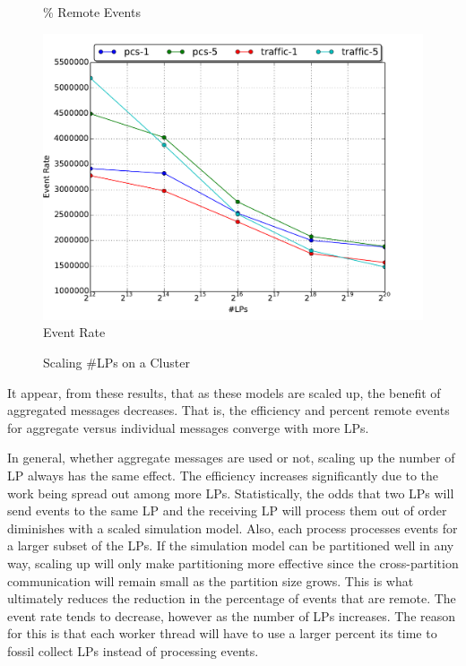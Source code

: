 \documentclass[11pt]{book}
\begin{document}
\begin{figure}
\begin{minipage}{.5\textwidth}
\begin{center}
      \% Remote Events \\
    \end{center}
  \end{minipage}
  \centering
  \begin{minipage}{.5\textwidth}
    \begin{center}
      \includegraphics[width=\textwidth,keepaspectratio,quiet]{figs/scale/scale_event_rate.pdf} \\
      Event Rate \\
    \end{center}
  \end{minipage}
  \caption{Scaling \#LPs on a Cluster}\label{scaling}
\end{figure}

It appear, from these results, that as these models are scaled up, the benefit of aggregated
messages decreases. That is, the efficiency and percent remote events for aggregate versus
individual messages converge with more LPs.

In general, whether aggregate messages are used or not, scaling up the number of LP always has
the same effect. The efficiency increases significantly due to the work being spread out among
more LPs. Statistically, the odds that two LPs will send events to the same LP and the receiving
LP will process them out of order diminishes with a scaled simulation model.
Also, each process processes events for a larger subset of the LPs. If the simulation model can
be partitioned well in any way, scaling up will only make partitioning more effective since
the cross-partition communication will remain small as the partition size grows. This is what
ultimately reduces the reduction in the percentage of events that are remote.
The event rate tends to decrease, however as the number of LPs increases. The reason for this
is that each worker thread will have to use a larger percent its time to fossil collect LPs
instead of processing events.
\end{document}
